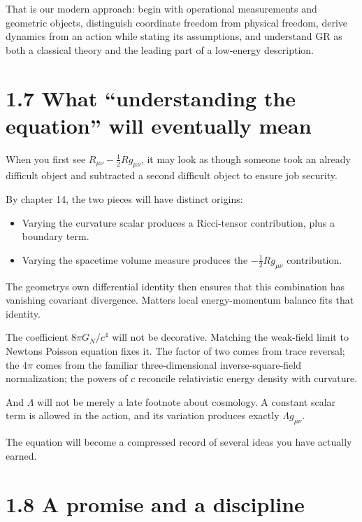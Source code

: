 \documentclass[
  11pt,
  letterpaper,
  oneside,
  openany]{scrbook}
\providecommand{\tightlist}{%
  \setlength{\itemsep}{0pt}\setlength{\parskip}{0pt}}
\begin{document}
That is our modern approach: begin with operational measurements and
geometric objects, distinguish coordinate freedom from physical freedom,
derive dynamics from an action while stating its assumptions, and
understand GR as both a classical theory and the leading part of a
low-energy description.

\hypertarget{what-understanding-the-equation-will-eventually-mean}{%
\section{1.7 What ``understanding the equation'' will eventually
mean}\label{what-understanding-the-equation-will-eventually-mean}}

When you first see \(R_{\mu\nu}-\tfrac12 Rg_{\mu\nu}\), it may look as
though someone took an already difficult object and subtracted a second
difficult object to ensure job security.

By chapter 14, the two pieces will have distinct origins:

\begin{itemize}
\tightlist
\item
  Varying the curvature scalar produces a Ricci-tensor contribution,
  plus a boundary term.
\item
  Varying the spacetime volume measure produces the
  \(-\tfrac12 Rg_{\mu\nu}\) contribution.
\end{itemize}

The geometry\textquotesingle s own differential identity then ensures
that this combination has vanishing covariant divergence.
Matter\textquotesingle s local energy-momentum balance fits that
identity.

The coefficient \(8\pi G_N/c^4\) will not be decorative. Matching the
weak-field limit to Newton\textquotesingle s Poisson equation fixes it.
The factor of two comes from trace reversal; the \(4\pi\) comes from the
familiar three-dimensional inverse-square-field normalization; the
powers of \(c\) reconcile relativistic energy density with curvature.

And \(\Lambda\) will not be merely a late footnote about cosmology. A
constant scalar term is allowed in the action, and its variation
produces exactly \(\Lambda g_{\mu\nu}\).

The equation will become a compressed record of several ideas you have
actually earned.

\hypertarget{a-promise-and-a-discipline}{%
\section{1.8 A promise and a
discipline}\label{a-promise-and-a-discipline}}
\end{document}
